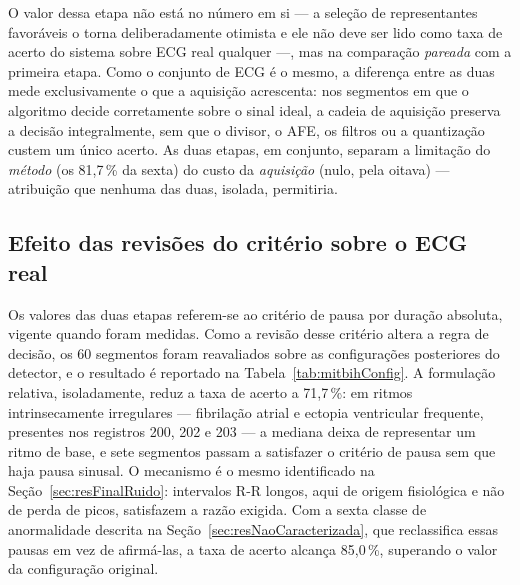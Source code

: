 O valor dessa etapa não está no número em si — a seleção de representantes favoráveis o torna deliberadamente otimista e ele não deve ser lido como taxa de acerto do sistema sobre \acs{ECG} real qualquer —, mas na comparação \emph{pareada} com a primeira etapa. Como o conjunto de \acs{ECG} é o mesmo, a diferença entre as duas mede exclusivamente o que a aquisição acrescenta: nos segmentos em que o algoritmo decide corretamente sobre o sinal ideal, a cadeia de aquisição preserva a decisão integralmente, sem que o divisor, o \acs{AFE}, os filtros ou a quantização custem um único acerto. As duas etapas, em conjunto, separam a limitação do \emph{método} (os 81,7\,\% da sexta) do custo da \emph{aquisição} (nulo, pela oitava) — atribuição que nenhuma das duas, isolada, permitiria.

\subsection{Efeito das revisões do critério sobre o ECG real}
\label{sec:resMitbihConfig}

Os valores das duas etapas referem-se ao critério de pausa por duração absoluta, vigente quando foram medidas. Como a revisão desse critério altera a regra de decisão, os 60 segmentos foram reavaliados sobre as configurações posteriores do detector, e o resultado é reportado na Tabela~\ref{tab:mitbihConfig}. A formulação relativa, isoladamente, reduz a taxa de acerto a 71,7\,\%: em ritmos intrinsecamente irregulares --- fibrilação atrial e ectopia ventricular frequente, presentes nos registros 200, 202 e 203 --- a mediana deixa de representar um ritmo de base, e sete segmentos passam a satisfazer o critério de pausa sem que haja pausa sinusal. O mecanismo é o mesmo identificado na Seção~\ref{sec:resFinalRuido}: intervalos R-R longos, aqui de origem fisiológica e não de perda de picos, satisfazem a razão exigida. Com a sexta classe de anormalidade descrita na Seção~\ref{sec:resNaoCaracterizada}, que reclassifica essas pausas em vez de afirmá-las, a taxa de acerto alcança 85,0\,\%, superando o valor da configuração original.

